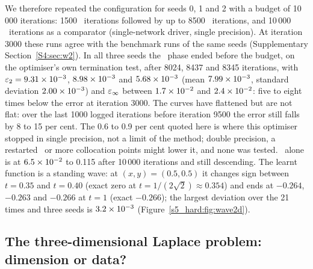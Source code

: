 We therefore repeated the  configuration for seeds 0, 1 and 2 with a budget of
10\,000 iterations: 1500 \Adam\ iterations followed by up to 8500 \LBFGS\ iterations, and
10\,000 \Adam\ iterations as a comparator (single-network driver, single precision). At
iteration 3000 these runs agree with the benchmark runs of the same seeds (Supplementary
Section~\ref{S4:sec:w2}).
In all three seeds the \LBFGS\ phase ended before the budget, on the optimiser's own
termination test, after 8024, 8437 and 8345 iterations, with
$\varepsilon_{2}=9.31\times 10^{-3}$, $8.98\times 10^{-3}$ and $5.68\times 10^{-3}$ (mean $7.99\times 10^{-3}$,
standard deviation $2.00\times 10^{-3}$) and $\varepsilon_{\infty}$ between $1.7\times 10^{-2}$ and
$2.4\times 10^{-2}$: five to eight times below the error at iteration 3000.
The curves have flattened but are not flat: over the last 1000 logged iterations before
iteration 9500 the error still falls by 8 to 15 per cent. The 0.6 to 0.9 per cent quoted
here is where this optimiser stopped in single precision, not a limit of the method; double
precision, a restarted \LBFGS\ or more collocation points might lower it, and none was
tested. \Adam\ alone is at $6.5\times 10^{-2}$ to 0.115 after 10\,000 iterations and still
descending.
The learnt function is a standing wave: at $(x,y)=(0.5,0.5)$ it changes sign between
$t=0.35$ and $t=0.40$ (exact zero at $t=1/(2\sqrt2)\approx 0.354$) and ends at $-0.264$,
$-0.263$ and $-0.266$ at $t=1$ (exact $-0.266$); the largest deviation over the 21 times and
three seeds is $3.2\times 10^{-3}$ (Figure~\ref{s5_hard:fig:wave2d}).

\subsection{The three-dimensional Laplace problem: dimension or data?}
\label{s5_hard:sec:l3}


